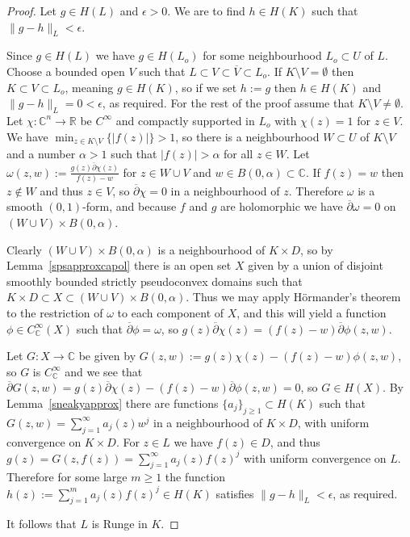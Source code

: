 \documentclass[11pt,a4paper, final, twoside]{article}
\numberwithin{equation}{section}
\newcommand{\C}{\mathbb C}
\newcommand{\R}{\mathbb R}
\newcommand{\con}[1]{\overline{#1}}
\newcommand{\clos}[1]{\overline{#1}}
\newcommand{\ball}{B}
\newcommand{\hol}{H}
\newcommand{\cts}{C}
\newcommand{\ccts}{C_{\mathbb C}}
\begin{document}
\begin{proof}
Let $g\in\hol(L)$ and $\epsilon>0$. We are to find $h\in\hol(K)$ such that $\|g-h\|_L<\epsilon$.

Since $g\in\hol(L)$ we have $g\in\hol(L_o)$ for some neighbourhood $L_o\subset U$ of $L$. 
Choose a bounded open $V$ such that $L\subset V\subset \clos V\subset L_o$. If $K\setminus V=\emptyset$ then $K\subset V\subset L_o$, meaning $g\in\hol(K)$, so if we set $h:=g$ then $h\in\hol(K)$
and $\|g-h\|_L=0<\epsilon$, as required. For the rest of the proof assume that $K\setminus V\neq\emptyset$.
Let $\chi\colon \C^n\to\R$ be $\cts^\infty$ and compactly supported in $L_o$ with $\chi(z)=1$ for $z\in V$. We have $\min_{z\in K\setminus V}\{|f(z)|\}>1$,
so there is a neighbourhood $W\subset U$ of $K\setminus V$ and a number $\alpha>1$ such that $|f(z)|>\alpha$ for all $z\in W$.
Let $\omega(z,w):=\frac{g(z)\con\partial\chi(z)}{f(z)-w}$ for $z\in W\cup V$ and $w\in\ball(0,\alpha)\subset\C$. If $f(z)=w$ then $z\not\in W$ and thus $z\in V$, so $\con\partial\chi=0$ in a neighbourhood
of $z$. Therefore $\omega$ is a smooth $(0,1)$-form, and because $f$ and $g$ are holomorphic we have $\con\partial\omega=0$ on $(W\cup V)\times \ball(0,\alpha)$.  

Clearly $(W\cup V)\times\ball(0,\alpha)$ 
is a neighbourhood of $K\times D$, so by Lemma~\ref{spsapproxcapol} there is an open set $X$ given by a union of disjoint smoothly bounded strictly pseudoconvex domains 
such that $K\times D\subset X\subset (W\cup V)\times\ball(0,\alpha)$.
Thus we may apply
H\"ormander's theorem to the restriction of $\omega$ to each component of $X$, and this will yield a function $\phi\in\ccts^\infty(X)$ such that
$\con\partial\phi = \omega$, so $g(z)\con\partial\chi(z)=(f(z)-w)\con\partial\phi(z,w)$. 

Let $G\colon X\to\C$ be given by $G(z,w):=g(z)\chi(z)-(f(z)-w)\phi(z,w)$, so $G$ is $\ccts^\infty$ and we see that
$\con\partial G(z,w)=g(z)\con\partial\chi(z)-(f(z)-w)\con\partial\phi(z,w)=0$, so $G\in\hol(X)$. 
By Lemma~\ref{sneakyapprox} there are functions $\{a_j\}_{j\geq 1}\subset\hol(K)$ such that $G(z,w)=\sum_{j=1}^\infty a_j(z)w^j$ in a neighbourhood of $K\times D$, with uniform convergence on $K\times D$.
For $z\in L$ we have $f(z)\in D$, and thus $g(z)=G(z,f(z))=\sum_{j=1}^\infty a_j(z)f(z)^j$ with uniform convergence on $L$.
Therefore for some large $m\geq 1$ the function $h(z):=\sum_{j=1}^m a_j(z)f(z)^j\in\hol(K)$ satisfies $\|g-h\|_L<\epsilon$, as required.

It follows that $L$ is Runge in $K$.
\end{proof}
\end{document}
